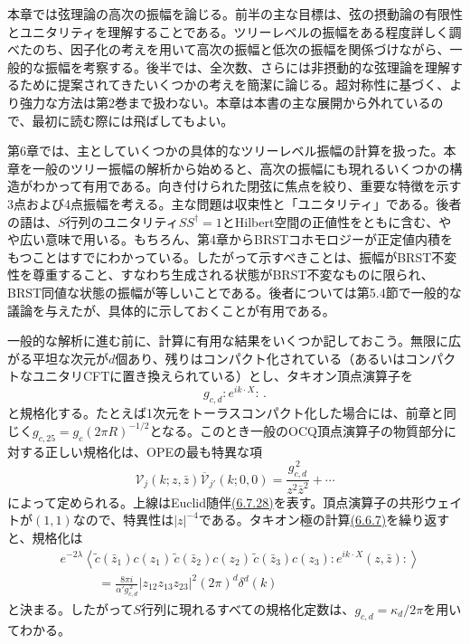 \label{ch:9}
本章では弦理論の高次の振幅を論じる。前半の主な目標は、弦の摂動論の有限性とユニタリティを理解することである。ツリーレベルの振幅をある程度詳しく調べたのち、因子化の考えを用いて高次の振幅と低次の振幅を関係づけながら、一般的な振幅を考察する。後半では、全次数、さらには非摂動的な弦理論を理解するために提案されてきたいくつかの考えを簡潔に論じる。超対称性に基づく、より強力な方法は第2巻まで扱わない。本章は本書の主な展開から外れているので、最初に読む際には飛ばしてもよい。

\label{sec:9.1}
第6章では、主としていくつかの具体的なツリーレベル振幅の計算を扱った。本章を一般のツリー振幅の解析から始めると、高次の振幅にも現れるいくつかの構造がわかって有用である。向き付けられた閉弦に焦点を絞り、重要な特徴を示す3点および4点振幅を考える。主な問題は収束性と「ユニタリティ」である。後者の語は、$S$行列のユニタリティ$SS^\dagger=1$とHilbert空間の正値性をともに含む、やや広い意味で用いる。もちろん、第4章からBRSTコホモロジーが正定値内積をもつことはすでにわかっている。したがって示すべきことは、振幅がBRST不変性を尊重すること、すなわち生成される状態がBRST不変なものに限られ、BRST同値な状態の振幅が等しいことである。後者については第5.4節で一般的な議論を与えたが、具体的に示しておくことが有用である。

一般的な解析に進む前に、計算に有用な結果をいくつか記しておこう。無限に広がる平坦な次元が$d$個あり、残りはコンパクト化されている（あるいはコンパクトなユニタリCFTに置き換えられている）とし、タキオン頂点演算子を
\begin{equation}
 g_{c,d}:e^{ik\cdot X}:\,.
 \tag{9.1.1}\label{eq:9.1.1}
\end{equation}
と規格化する。たとえば1次元をトーラスコンパクト化した場合には、前章と同じく$g_{c,25}=g_c(2\pi R)^{-1/2}$となる。このとき一般のOCQ頂点演算子の物質部分に対する正しい規格化は、OPEの最も特異な項
\begin{equation}
 \mathcal V_j(k;z,\bar z)\overline{\mathcal V}_{j'}(k;0,0)
 =\frac{g_{c,d}^{\,2}}{z^2\bar z^2}+\cdots
 \tag{9.1.2}\label{eq:9.1.2}
\end{equation}
によって定められる。上線はEuclid随伴\hyperref[eq:6.7.28]{(6.7.28)}を表す。頂点演算子の共形ウェイトが$(1,1)$なので、特異性は$|z|^{-4}$である。タキオン極の計算\hyperref[eq:6.6.7]{(6.6.7)}を繰り返すと、規格化は
\begin{equation}
 \begin{aligned}
 &e^{-2\lambda}\left\langle\tilde c(\bar z_1)c(z_1)\,
 \tilde c(\bar z_2)c(z_2)\,\tilde c(\bar z_3)c(z_3)
 :e^{ik\cdot X}(z,\bar z):\right\rangle\\
 &\hspace{3em}=\frac{8\pi i}{\alpha'g_{c,d}^{\,2}}
 |z_{12}z_{13}z_{23}|^2(2\pi)^d\delta^d(k)
 \end{aligned}
 \tag{9.1.3}\label{eq:9.1.3}
\end{equation}
と決まる。したがって$S$行列に現れるすべての規格化定数は、$g_{c,d}=\kappa_d/2\pi$を用いてわかる。

